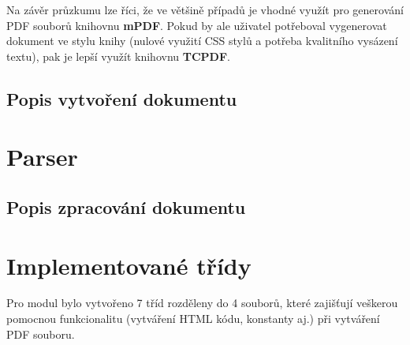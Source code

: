 \par
Na závěr průzkumu lze říci, že ve většině případů je vhodné využít pro generování PDF souborů knihovnu \textbf{mPDF}. Pokud by ale uživatel potřeboval vygenerovat dokument ve stylu knihy (nulové využití CSS stylů a potřeba kvalitního vysázení textu), pak je lepší využít knihovnu \textbf{TCPDF}. 
\subsection{Popis vytvoření dokumentu}

\section{Parser}

\subsection{Popis zpracování dokumentu}

\section{Implementované třídy}
Pro modul bylo vytvořeno 7 tříd rozděleny do 4 souborů, které zajišťují veškerou pomocnou funkcionalitu (vytváření HTML kódu, konstanty aj.) při vytváření PDF souboru. 
